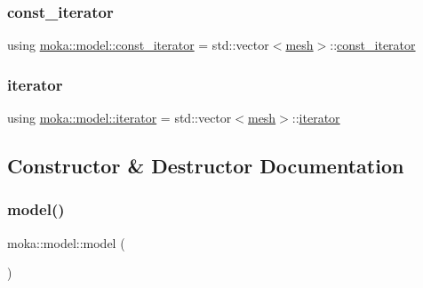 \subsubsection{\texorpdfstring{const\_iterator}{const\_iterator}}
{\footnotesize\ttfamily using \mbox{\hyperlink{classmoka_1_1model_a2320ba22d7cfd04cd0bba753ab8e10a8}{moka\+::model\+::const\+\_\+iterator}} =  std\+::vector$<$\mbox{\hyperlink{classmoka_1_1mesh}{mesh}}$>$\+::\mbox{\hyperlink{classmoka_1_1model_a2320ba22d7cfd04cd0bba753ab8e10a8}{const\+\_\+iterator}}}

\mbox{\label{classmoka_1_1model_a2fa7c32a9fe64904609be78bb8d1abdf}} 
\subsubsection{\texorpdfstring{iterator}{iterator}}
{\footnotesize\ttfamily using \mbox{\hyperlink{classmoka_1_1model_a2fa7c32a9fe64904609be78bb8d1abdf}{moka\+::model\+::iterator}} =  std\+::vector$<$\mbox{\hyperlink{classmoka_1_1mesh}{mesh}}$>$\+::\mbox{\hyperlink{classmoka_1_1model_a2fa7c32a9fe64904609be78bb8d1abdf}{iterator}}}



\subsection{Constructor \& Destructor Documentation}
\mbox{\label{classmoka_1_1model_a0a521b47697304abea0e06655afa8fc8}} 
\subsubsection{\texorpdfstring{model()}{model()}\hspace{0.1cm}{\footnotesize\ttfamily [1/3]}}
{\footnotesize\ttfamily moka\+::model\+::model (\begin{DoxyParamCaption}{ }\end{DoxyParamCaption})\hspace{0.3cm}{\ttfamily [default]}}

\mbox{\label{classmoka_1_1model_a9d2815c2585fe973590054e1d05f822a}} 
